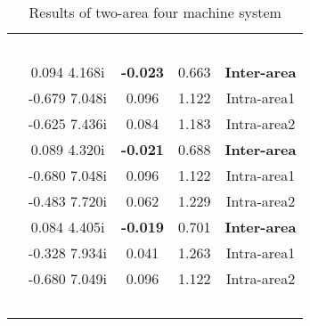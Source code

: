 \documentclass[conference,11pt]{IEEEtran}
\begin{document}
\begin{table}[t]
\centering
\caption{Results of two-area four machine system}
\label{tab:table1}
\renewcommand{\arraystretch}{1}
\begin{tabular}{||c|c|c|c|c||}
\hline
\hline
\multirow{2}{*}{\parbox{1.1cm}{\\}}  & 
\multirow{2}{*}{\parbox{1.4cm}{}} & 
\multirow{2}{*}{\parbox{1.1cm}{}} & 
\multirow{2}{*}{\parbox{0.8cm}{}} & 
\multirow{2}{*}{\parbox{1.2cm}{}}  \\
{}       &      {}     &         {} &      {}     &       {} \\ \hline
\hline  
\multirow{3}{*}{\centering {10\%WG}}  & 0.094  4.168i   & \bf{-0.023} & 0.663 & \bf{Inter-area}\\
{}                                          &-0.679  7.048i   &  0.096 & 1.122 & Intra-area1\\
{}                                          &-0.625  7.436i   &  0.084 & 1.183 & Intra-area2\\ \hline
\multirow{3}{*}{\centering {25\%WG}}    & 0.089  4.320i   & \bf{-0.021} & 0.688 & \bf{Inter-area}\\ 
{}                                         &-0.680  7.048i   &  0.096 & 1.122 & Intra-area1\\ 
{}                                          &-0.483  7.720i   &  0.062 & 1.229 & Intra-area2\\ \hline
\multirow{3}{*}{\centering {35\%WG}}   & 0.084  4.405i   & \bf{-0.019} & 0.701 & \bf{Inter-area}\\ 
{}                                          &-0.328  7.934i   &  0.041 & 1.263 & Intra-area1\\ 
{}                                         &-0.680  7.049i   &  0.096 & 1.122 & Intra-area2\\ \hline \hline
\multirow{2}{*}{\parbox{1.1cm}{\\}}  & 
\multirow{2}{*}{\parbox{1.4cm}{}} & 
\multirow{2}{*}{\parbox{1.1cm}{}} & 
\multirow{2}{*}{\parbox{0.8cm}{}} & 
\multirow{2}{*}{\parbox{1.2cm}{}}  \\
{}       &      {}     &         {} &      {}     &       {} \\ \hline

\end{tabular}
\end{table}
\end{document}
